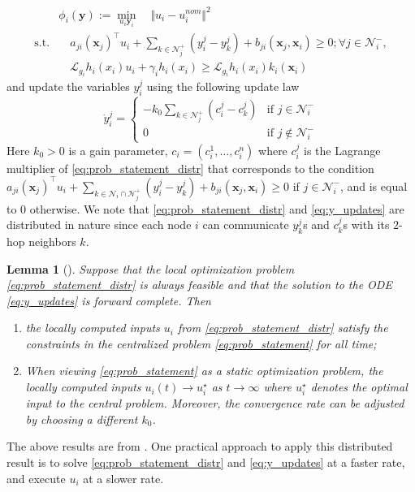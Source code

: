 \documentclass[letterpaper, 10 pt, conference]{ieeeconf}  %
\theoremstyle{plain}
\newtheorem{lemma}{Lemma}
\begin{document}
\vspace{-2ex}
\small
\begin{align}
    &\phi_i(\mathbf{y}) := \min_{u_i \mathbf{y}_i} \quad \Vert u_i - u_{i}^{nom} \Vert^2 \nonumber\\
     \text{s.t.} & \quad a_{ji}(\mathbf{x}_j)^\top u_i  + \sum_{k \in \mathcal{N}_j^+} (y_i^j - y_k^j) +  b_{ji}(\mathbf{x}_j,\mathbf{x}_i) \geq 0
     ;\forall j \in \mathcal{N}_i^-, \nonumber\\
     & \quad
     \mathcal{L}_{g_i}h_i(x_i) u_i +  \gamma_i h_i(x_i) \geq \mathcal{L}_{g_i}h_i(x_i) k_i(\mathbf{x}_i) \label{eq:prob_statement_distr}
\end{align}
\normalsize
and update the variables $y_i^j$ using the following update law
\begin{equation} \label{eq:y_updates}
    \dot{y}_i^j = 
    \begin{cases}
        -k_0 \sum_{k \in \mathcal{N}_j^+} (c_i^j - c_k^j) & \text{if } j \in \mathcal{N}_i^- \\
        0 & \text{if } j \notin \mathcal{N}_i^-
    \end{cases}
\end{equation}
Here $k_0>0$ is a gain parameter, $c_i = (c_i^1, \dots, c_i^n)$ where $c_i^j$ is the Lagrange multiplier of \eqref{eq:prob_statement_distr} that corresponds to the condition $ a_{ji}(\mathbf{x}_j)^\top u_i  + \sum_{k \in \mathcal{N}_i \cap \mathcal{N}_j^+} (y_i^j - y_k^j) +  b_{ji}(\mathbf{x}_j,\mathbf{x}_i) \geq 0$ if $j \in \mathcal{N}_i^-$, and is equal to $0$ otherwise. We note that \eqref{eq:prob_statement_distr} and \eqref{eq:y_updates} are distributed in nature since each node $i$ can communicate  $y^j_k$s and $c^j_k$s with its $2$-hop neighbors $k$.

\begin{lemma}[\hspace{-0.1pt}\cite{xiao2025continuous}] \label{lem:distributed_optimization}
    Suppose that the local optimization problem \eqref{eq:prob_statement_distr} is always feasible and that the solution to the ODE \eqref{eq:y_updates} is forward complete. Then
    \begin{enumerate}
        \item the locally computed inputs $u_i$ from \eqref{eq:prob_statement_distr} satisfy the constraints in the centralized problem \eqref{eq:prob_statement} for all time;
        \item When viewing  \eqref{eq:prob_statement} as a static optimization problem, the locally computed inputs $u_i(t)\to u_i^\star$ as $t\to\infty$ where $u_i^\star$ denotes the optimal input to the central problem. Moreover, the convergence rate can be adjusted by choosing a different $k_0$.
    \end{enumerate}
\end{lemma}
The above results are from \cite[Theorem~2]{xiao2025continuous}. One practical approach to apply this distributed result is to solve \eqref{eq:prob_statement_distr} and \eqref{eq:y_updates} at a faster rate, and execute $u_i$ at a slower rate.
\end{document}
